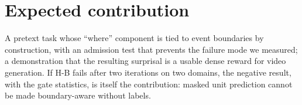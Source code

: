\documentclass[10pt,twocolumn]{article}
\begin{document}
\section{Expected contribution}
A pretext task whose ``where'' component is tied to event boundaries by construction, with an admission test that prevents the failure mode we measured; a demonstration that the resulting surprisal is a usable dense reward for video generation. If H-B fails after two iterations on two domains, the negative result, with the gate statistics, is itself the contribution: masked unit prediction cannot be made boundary-aware without labels.
\end{document}
